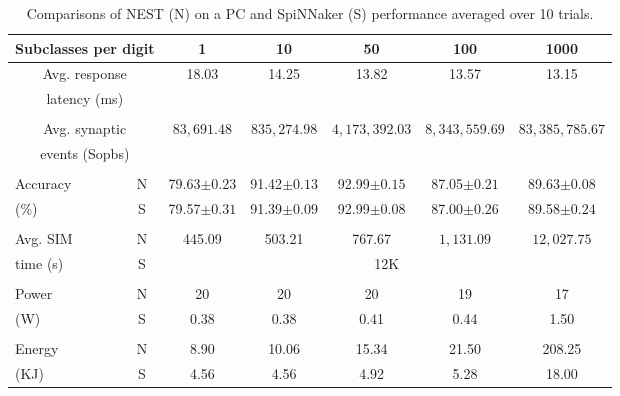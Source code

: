 \begin{table} 
	\caption[Comparisons of NEST and SpiNNaker performance.]{Comparisons of NEST (N) on a PC and SpiNNaker (S) performance averaged over 10 trials.}
	\begin{center}
		\bgroup
		\def\arraystretch{1.4}
		\begin{tabular} {l| c  c c c c c}
			\multicolumn{2}{c}{Subclasses per digit} 
			& 1 & 10 & 50 & 100 & 1000 \\
			\hline
			\multicolumn{2}{c}{Avg. response}
			& \multirow{2}{*}{18.03} %
			& \multirow{2}{*}{14.25} %
			& \multirow{2}{*}{13.82} %
			& \multirow{2}{*}{13.57} %
			& \multirow{2}{*}{13.15} %
			\\
			\multicolumn{2}{c}{latency (ms)}
			& & & & &
			\\
			\multicolumn{7}{c}{\vspace*{-3mm}}\\
			\multicolumn{2}{c}{Avg. synaptic}
			& \multirow{2}{*}{$83,691.48$}
			& \multirow{2}{*}{$835,274.98$}
			& \multirow{2}{*}{$4,173,392.03$}
			& \multirow{2}{*}{$8,343,559.69$}
			& \multirow{2}{*}{$83,385,785.67$}
			\\	
			\multicolumn{2}{c}{events (Sopbs)}
			& & & & &
			\\
			\multicolumn{7}{c}{\vspace*{-3mm}}\\
			Accuracy
			& N 
			& 79.63$\pm0.23$
			& 91.42$\pm0.13$ 
			& 92.99$\pm0.15$
			& 87.05$\pm0.21$
			& 89.63$\pm0.08$
			\\
			(\%)
			& S
			& 79.57$\pm0.31$
			& 91.39$\pm0.09$
			& 92.99$\pm0.08$
			& 87.00$\pm0.26$
			& 89.58$\pm0.24$
			\\
			& &\multicolumn{5}{c}{\vspace*{-4mm}}\\
			Avg. SIM
			& N 
			& 445.09
			& 503.21
			& 767.67
			& $1,131.09$
			& $12,027.75$
			\\
			time (s)
			& S
			& \multicolumn{5}{c}{12K}
			\\
			& &\multicolumn{5}{c}{\vspace*{-4mm}}\\
			Power
			& N 
			& 20
			& 20
			& 20
			& 19
			& 17
			\\
			(W) %
			& S
			& 0.38 
			& 0.38 
			& 0.41
			& 0.44
			& 1.50
			\\
			& &\multicolumn{5}{c}{\vspace*{-4mm}}\\
			Energy
			& N 
			& 8.90
			& 10.06
			& 15.34
			& 21.50
			& 208.25
			\\
			(KJ) %
			& S
			& 4.56
			& 4.56
			& 4.92
			& 5.28
			& 18.00
			\\
		\end{tabular}
		\egroup
		\label{tbl:compare}
	\end{center}
\end{table}


